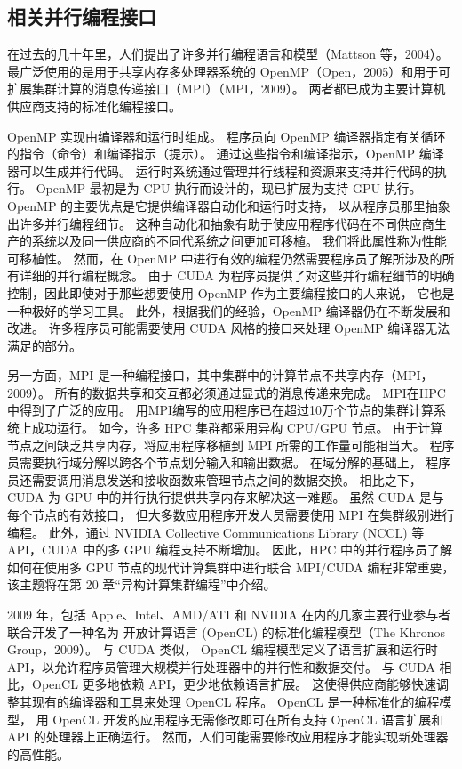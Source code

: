 \subsection{相关并行编程接口}
在过去的几十年里，人们提出了许多并行编程语言和模型（Mattson 等，2004）。 
最广泛使用的是用于共享内存多处理器系统的 OpenMP（Open，2005）和用于可扩展集群计算的消息传递接口（MPI）（MPI，2009）。 
两者都已成为主要计算机供应商支持的标准化编程接口。

OpenMP 实现由编译器和运行时组成。 程序员向 OpenMP 编译器指定有关循环的指令（命令）和编译指示（提示）。 
通过这些指令和编译指示，OpenMP 编译器可以生成并行代码。 运行时系统通过管理并行线程和资源来支持并行代码的执行。 
OpenMP 最初是为 CPU 执行而设计的，现已扩展为支持 GPU 执行。 OpenMP 的主要优点是它提供编译器自动化和运行时支持，
以从程序员那里抽象出许多并行编程细节。 
这种自动化和抽象有助于使应用程序代码在不同供应商生产的系统以及同一供应商的不同代系统之间更加可移植。 
我们将此属性称为性能可移植性。 然而，在 OpenMP 中进行有效的编程仍然需要程序员了解所涉及的所有详细的并行编程概念。 
由于 CUDA 为程序员提供了对这些并行编程细节的明确控制，因此即使对于那些想要使用 OpenMP 作为主要编程接口的人来说，
它也是一种极好的学习工具。 此外，根据我们的经验，OpenMP 编译器仍在不断发展和改进。 
许多程序员可能需要使用 CUDA 风格的接口来处理 OpenMP 编译器无法满足的部分。

另一方面，MPI 是一种编程接口，其中集群中的计算节点不共享内存（MPI，2009）。 
所有的数据共享和交互都必须通过显式的消息传递来完成。 MPI在HPC中得到了广泛的应用。 
用MPI编写的应用程序已在超过10万个节点的集群计算系统上成功运行。 如今，许多 HPC 集群都采用异构 CPU/GPU 节点。 
由于计算节点之间缺乏共享内存，将应用程序移植到 MPI 所需的工作量可能相当大。 
程序员需要执行域分解以跨各个节点划分输入和输出数据。 在域分解的基础上，
程序员还需要调用消息发送和接收函数来管理节点之间的数据交换。 相比之下，
CUDA 为 GPU 中的并行执行提供共享内存来解决这一难题。 虽然 CUDA 是与每个节点的有效接口，
但大多数应用程序开发人员需要使用 MPI 在集群级别进行编程。 
此外，通过 NVIDIA Collective Communications Library (NCCL) 等 API，CUDA 中的多 GPU 编程支持不断增加。 
因此，HPC 中的并行程序员了解如何在使用多 GPU 节点的现代计算集群中进行联合 MPI/CUDA 编程非常重要，
该主题将在第 20 章“异构计算集群编程”中介绍。

2009 年，包括 Apple、Intel、AMD/ATI 和 NVIDIA 在内的几家主要行业参与者联合开发了一种名为
开放计算语言 (OpenCL) 的标准化编程模型（The Khronos Group，2009）。 与 CUDA 类似，
OpenCL 编程模型定义了语言扩展和运行时 API，以允许程序员管理大规模并行处理器中的并行性和数据交付。 
与 CUDA 相比，OpenCL 更多地依赖 API，更少地依赖语言扩展。 
这使得供应商能够快速调整其现有的编译器和工具来处理 OpenCL 程序。 OpenCL 是一种标准化的编程模型，
用 OpenCL 开发的应用程序无需修改即可在所有支持 OpenCL 语言扩展和 API 的处理器上正确运行。 
然而，人们可能需要修改应用程序才能实现新处理器的高性能。

